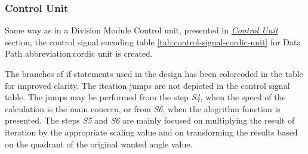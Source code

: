 \documentclass[a4paper, twoside, 11pt]{article}
\begin{document}
        \subsubsection{Control Unit}\label{subsubsec:cordic-control-unit}
        Same way as in a Division Module Control unit, presented in \hyperref[subsubsec:division-control-unit]{\textit{Control Unit}} section, the control signal encoding table \ref{tab:control-signal-cordic-unit} for Data Path \gls{abbreviation:cordic} unit is created.\par
        The branches of if statements used in the design has been colorcoded in the table for improved clarity. The iteation jumps are not depicted in the control signal table. The jumps may be performed from the step \textit{S4}, when the speed of the calculation is the main concern, or from \textit{S6}, when the alogrithm function is presented. The steps \textit{S5} and \textit{S6} are mainly focused on multiplying the result of iteration by the appropriate scaling value and on transforming the results based on the quadrant of the original wanted angle value.
\end{document}
